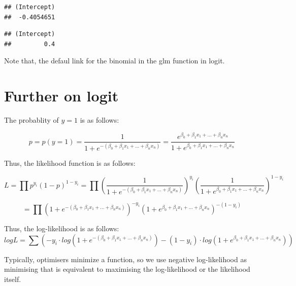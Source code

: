 \documentclass[]{book}
\newenvironment{Shaded}{\begin{snugshade}}{\end{snugshade}}
\newcommand{\DecValTok}[1]{\textcolor[rgb]{0.00,0.00,0.81}{#1}}
\newcommand{\KeywordTok}[1]{\textcolor[rgb]{0.13,0.29,0.53}{\textbf{#1}}}
\newcommand{\NormalTok}[1]{#1}
\newcommand{\OperatorTok}[1]{\textcolor[rgb]{0.81,0.36,0.00}{\textbf{#1}}}
\begin{document}
\begin{verbatim}
## (Intercept) 
##  -0.4054651
\end{verbatim}

\begin{Shaded}
\end{Shaded}

\begin{verbatim}
## (Intercept) 
##         0.4
\end{verbatim}

Note that, the defaul link for the binomial in the glm function in logit.

\hypertarget{further-on-logit}{%
\section{Further on logit}\label{further-on-logit}}

The probablity of \(y=1\) is as follows:

\[p=p(y=1)=\frac{1}{1+e^{-(\beta_0+\beta_1x_1+...+\beta_nx_n)}}=\frac{e^{\beta_0+\beta_1x_1+...+\beta_nx_n}}{1+e^{\beta_0+\beta_1x_1+...+\beta_nx_n}}\]

Thus, the likelihood function is as follows:

\[L=\prod p^{y_i}(1-p)^{1-y_i}=\prod (\frac{1}{1+e^{-(\beta_0+\beta_1x_1+...+\beta_nx_n)}})^{y_i}(\frac{1}{1+e^{\beta_0+\beta_1x_1+...+\beta_nx_n}})^{1-y_i}\]

\[=\prod (1+e^{-(\beta_0+\beta_1x_1+...+\beta_nx_n)})^{-y_i}(1+e^{\beta_0+\beta_1x_1+...+\beta_nx_n})^{-(1-y_i)}\]

Thus, the log-likelihood is as follows:
\[logL=\sum (-y_i \cdot log(1+e^{-(\beta_0+\beta_1x_1+...+\beta_nx_n)})-(1-y_i)\cdot log(1+e^{\beta_0+\beta_1x_1+...+\beta_nx_n}))\]

Typically, optimisers minimize a function, so we use negative log-likelihood as minimising that is equivalent to maximising the log-likelihood or the likelihood itself.
\end{document}
